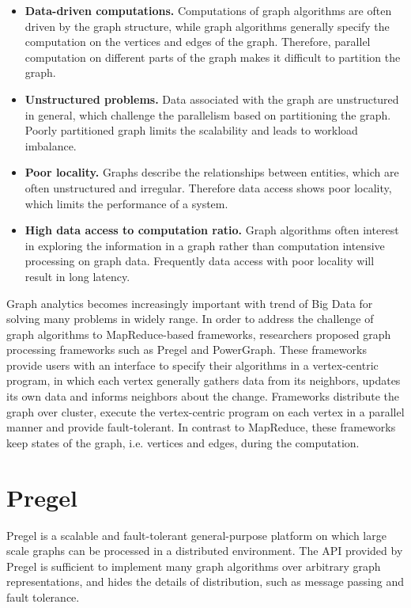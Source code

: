 \begin{itemize}
	\item \textbf{Data-driven computations.} Computations of graph algorithms are often driven by the graph structure, while graph algorithms generally specify the computation on the vertices and edges of the graph. Therefore, parallel computation on different parts of the graph makes it difficult to partition the graph. 
	\item \textbf{Unstructured problems.} Data associated with the graph are unstructured in general, which challenge the parallelism based on partitioning the graph. Poorly partitioned graph limits the scalability and leads to workload imbalance. 
	\item \textbf{Poor locality.} Graphs describe the relationships between entities, which are often unstructured and irregular. Therefore data access shows poor locality, which limits the performance of a system.
	\item \textbf{High data access to computation ratio.} Graph algorithms often interest in exploring the information in a graph rather than computation intensive processing on graph data. Frequently data access with poor locality will result in long latency.
\end{itemize}

Graph analytics becomes increasingly important with trend of Big Data for solving many problems in widely range. In order to address the challenge of graph algorithms to MapReduce-based frameworks, researchers proposed graph processing frameworks such as Pregel\cite{malewicz2010pregel} and PowerGraph\cite{gonzalez2012powergraph}. These frameworks provide users with an interface to specify their algorithms in a vertex-centric program, in which each vertex generally gathers data from its neighbors, updates its own data and informs neighbors about the change. Frameworks distribute the graph over cluster, execute the vertex-centric program on each vertex in a parallel manner and provide fault-tolerant. In contrast to MapReduce, these frameworks keep states of the graph, i.e. vertices and edges, during the computation.

\section{Pregel}

Pregel is a scalable and fault-tolerant general-purpose platform on which large scale graphs can be processed in a distributed environment. The API provided by Pregel is sufficient to implement many graph algorithms over arbitrary graph representations, and hides the details of distribution, such as message passing and fault tolerance.


